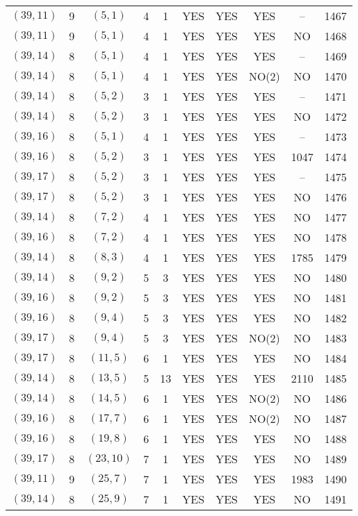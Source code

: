 \begin{longtable}{|c|c|c|c|c|c|c|c|c|c|}
$(39, 11)$ & 9 & $(5, 1)$ & 4 & 1 & YES & YES & YES & -- & 1467\\
$(39, 11)$ & 9 & $(5, 1)$ & 4 & 1 & YES & YES & YES & NO & 1468\\
$(39, 14)$ & 8 & $(5, 1)$ & 4 & 1 & YES & YES & YES & -- & 1469\\
$(39, 14)$ & 8 & $(5, 1)$ & 4 & 1 & YES & YES & NO(2) & NO & 1470\\
$(39, 14)$ & 8 & $(5, 2)$ & 3 & 1 & YES & YES & YES & -- & 1471\\
$(39, 14)$ & 8 & $(5, 2)$ & 3 & 1 & YES & YES & YES & NO & 1472\\
$(39, 16)$ & 8 & $(5, 1)$ & 4 & 1 & YES & YES & YES & -- & 1473\\
$(39, 16)$ & 8 & $(5, 2)$ & 3 & 1 & YES & YES & YES & 1047 & 1474\\
$(39, 17)$ & 8 & $(5, 2)$ & 3 & 1 & YES & YES & YES & -- & 1475\\
$(39, 17)$ & 8 & $(5, 2)$ & 3 & 1 & YES & YES & YES & NO & 1476\\
$(39, 14)$ & 8 & $(7, 2)$ & 4 & 1 & YES & YES & YES & NO & 1477\\
$(39, 16)$ & 8 & $(7, 2)$ & 4 & 1 & YES & YES & YES & NO & 1478\\
$(39, 14)$ & 8 & $(8, 3)$ & 4 & 1 & YES & YES & YES & 1785 & 1479\\
$(39, 14)$ & 8 & $(9, 2)$ & 5 & 3 & YES & YES & YES & NO & 1480\\
$(39, 16)$ & 8 & $(9, 2)$ & 5 & 3 & YES & YES & YES & NO & 1481\\
$(39, 16)$ & 8 & $(9, 4)$ & 5 & 3 & YES & YES & YES & NO & 1482\\
$(39, 17)$ & 8 & $(9, 4)$ & 5 & 3 & YES & YES & NO(2) & NO & 1483\\
$(39, 17)$ & 8 & $(11, 5)$ & 6 & 1 & YES & YES & YES & NO & 1484\\
$(39, 14)$ & 8 & $(13, 5)$ & 5 & 13 & YES & YES & YES & 2110 & 1485\\
$(39, 14)$ & 8 & $(14, 5)$ & 6 & 1 & YES & YES & NO(2) & NO & 1486\\
$(39, 16)$ & 8 & $(17, 7)$ & 6 & 1 & YES & YES & NO(2) & NO & 1487\\
$(39, 16)$ & 8 & $(19, 8)$ & 6 & 1 & YES & YES & YES & NO & 1488\\
$(39, 17)$ & 8 & $(23, 10)$ & 7 & 1 & YES & YES & YES & NO & 1489\\
$(39, 11)$ & 9 & $(25, 7)$ & 7 & 1 & YES & YES & YES & 1983 & 1490\\
$(39, 14)$ & 8 & $(25, 9)$ & 7 & 1 & YES & YES & YES & NO & 1491\\

\end{longtable}
